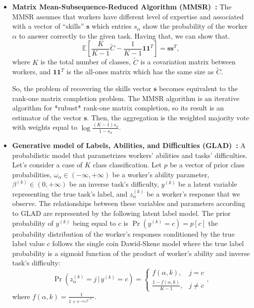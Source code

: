\begin{itemize}
    \item \textbf{Matrix Mean-Subsequence-Reduced Algorithm (MMSR)~\cite{ma_Adversarial_2020,crowdkit_webpage_documentation}:} The MMSR assumes that workers have different level of expertise and associated with a vector of ``skills'' $\boldsymbol{s}$ which entries $s_{\alpha}$ show the probability of the worker $\alpha$ to answer correctly to the given task. Having that, we can show that.%
    \begin{equation}
        \mathbb{E}\left[\frac{K}{K-1}\widetilde{C}-\frac{1}{K-1}\boldsymbol{1}\boldsymbol{1}^T\right]
        = \boldsymbol{s}\boldsymbol{s}^T,
    \end{equation}
    where $K$ is the total number of classes, $\widetilde{C}$ is a covariation matrix between workers, and $\boldsymbol{1}\boldsymbol{1}^T$ is the all-ones matrix which has the same size as $\widetilde{C}$.

    So, the problem of recovering the skills vector $\boldsymbol{s}$ becomes equivalent to the rank-one matrix completion problem. The MMSR algorithm is an iterative algorithm for *rubust* rank-one matrix completion, so its result is an estimator of the vector $\boldsymbol{s}$. Then, the aggregation is the weighted majority vote with weights equal to $\log \frac{(K-1)s_{\alpha}}{1-s_{\alpha}}$.

    \item \textbf{Generative model of Labels, Abilities, and Difficulties (GLAD)~\cite{whitehill_Whose_2009,crowdkit_webpage_documentation}:} A probabilistic model that parametrizes workers' abilities and tasks' difficulties. Let's consider a case of $K$ class classification. Let $p$ be a vector of prior class probabilities, $\omega_{\alpha} \in (-\infty, +\infty)$ be a worker's ability parameter, $\beta^{(k)} \in (0, +\infty)$ be an inverse task's difficulty, $y^{(k)}$ be a latent variable representing the true task's label, and $z_{\alpha}^{(k)}$ be a worker's response that we observe. The relationships between these variables and parameters according to GLAD are represented by the following latent label model.
    The prior probability of $y^{(k)}$ being equal to $c$ is $\Pr(y^{(k)} = c) = p[c]$
    the probability distribution of the worker's responses conditioned by the true label value $c$ follows the single coin Dawid-Skene model where the true label probability is a sigmoid function of the product of worker's ability and inverse task's difficulty:
    \begin{equation}
        \Pr \left( z^{(k)}_\alpha = j \, \vert \, y^{(k)} = c \right) = \begin{cases}f(\alpha, k), & j = c \\ \frac{1 - f(\alpha, k)}{K-1}, & j \neq c \end{cases},
    \end{equation}
    where $f(\alpha, k) = \frac{1}{1 + e^{-\omega_{\alpha} \beta^{(k)} }}$.


\end{itemize}
